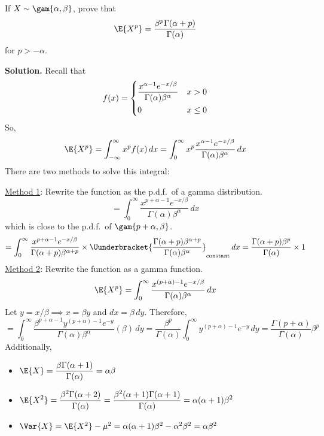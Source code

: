 \begin{Example}{}{}
    If $ X \sim \gam{\alpha,\beta}$, prove that
    \[ \E{X^p}=\frac{\beta^p\Gamma(\alpha+p)}{\Gamma(\alpha)}  \]
    for $ p>-\alpha $.

    \textbf{Solution.} Recall that
    \[ f(x)=\begin{dcases}
            \frac{x^{\alpha-1}e^{-x/\beta}}{\Gamma(\alpha)\beta^\alpha} & x>0    \\
            0                                                           & x\le 0
        \end{dcases} \]
    So,
    \[ \E{X^p}=\int_{-\infty}^{\infty} x^p f(x)\, d{x}
        =\int_{0}^{\infty} x^p \frac{x^{\alpha-1}e^{-x/\beta}}{\Gamma(\alpha)\beta^\alpha}\, d{x}
    \]
    There are two methods to solve this integral:

    \underline{Method 1}: Rewrite the function as the p.d.f.\ of a gamma
    distribution.
    \[ =\int_{0}^{\infty} \frac{x^{p+\alpha-1}e^{-x/\beta}}{\Gamma(\alpha)\beta^\alpha} \, d{x}  \]
    which is close to the p.d.f.\ of $ \gam{p+\alpha,\beta}$.
    \[ =\int_{0}^{\infty} \frac{x^{p+\alpha-1}e^{-x/\beta}}{\Gamma(\alpha+p)\beta^{\alpha+p}}\times
        \Uunderbracket{\frac{\Gamma(\alpha+p)\beta^{\alpha+p}}{\Gamma(\alpha)\beta^\alpha}}_{\text{constant}}  \, d{x}=
        \frac{\Gamma(\alpha+p)\beta^p}{\Gamma(\alpha)}\times 1   \]
    \underline{Method 2}: Rewrite the function as a gamma function.
    \[ \E{X^p}=\int_{0}^{\infty} \frac{x^{(p+\alpha)-1} e^{-x/\beta}}{\Gamma(\alpha)\beta^\alpha} \, d{x} \]
    Let $ y=x/\beta \implies x=\beta y$ and $ dx=\beta\,dy $. Therefore,
    \[ =\int_{0}^{\infty} \frac{\beta^{p+\alpha-1}y^{(p+\alpha)-1}e^{-y}}{\Gamma(\alpha)\beta^\alpha} (\beta)\, d{y}
        =\frac{\beta^p}{\Gamma(\alpha)}\int_{0}^{\infty} y^{(p+\alpha)-1}e^{-y}\, d{y}
        =\frac{\Gamma(p+\alpha)}{\Gamma(\alpha)}\beta^p     \]
    Additionally,
    \begin{itemize}
        \item $ \displaystyle \E{X}= \frac{\beta\Gamma(\alpha+1)}{\Gamma(\alpha)} =\alpha\beta $
        \item $ \displaystyle \E{X^2}= \frac{\beta^2\Gamma(\alpha+2)}{\Gamma(\alpha)}=\frac{\beta^2(\alpha+1)\Gamma(\alpha+1)}{\Gamma(\alpha)}=
                  \alpha(\alpha+1)\beta^2   $
        \item $ \Var{X}=\E{X^2}-\mu^2=\alpha(\alpha+1)\beta^2-\alpha^2\beta^2=\alpha\beta^2 $
    \end{itemize}
\end{Example}
